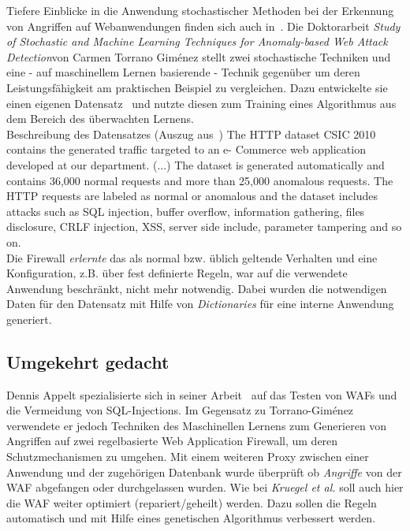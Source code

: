 Tiefere Einblicke in die Anwendung stochastischer Methoden bei der Erkennung von Angriffen auf Webanwendungen finden sich auch in~\cite{Giménez2015}. Die Doktorarbeit \glqq\emph{Study of Stochastic and Machine Learning Techniques for Anomaly-based Web Attack Detection}\grqq von Carmen Torrano Giménez stellt zwei stochastische Techniken und eine - auf maschinellem Lernen basierende - Technik gegenüber um deren Leistungsfähigkeit am praktischen Beispiel zu vergleichen. Dazu entwickelte sie einen eigenen Datensatz~\cite{csic2010} und nutzte diesen zum Training eines Algorithmus aus dem Bereich des überwachten Lernens.\\

\textcolor{bhtGray}{ Beschreibung des Datensatzes (Auszug aus~\cite{csic2010})} The HTTP dataset CSIC 2010 contains the generated traffic targeted to an e- Commerce web application developed at our department. (...) The dataset is generated automatically and contains 36,000 normal requests and more than 25,000 anomalous requests. The HTTP requests are labeled as normal or anomalous and the dataset includes attacks such as SQL injection, buffer overflow, information gathering, files disclosure, CRLF injection, XSS, server side include, parameter tampering and so on.\\

Die Firewall \emph{erlernte} das als normal bzw. üblich geltende Verhalten und eine Konfiguration, z.B. über fest definierte Regeln, war auf die verwendete Anwendung beschränkt, nicht mehr notwendig. Dabei wurden die notwendigen Daten für den Datensatz mit Hilfe von \emph{Dictionaries} für eine interne Anwendung generiert.


\subsection{Umgekehrt gedacht}

Dennis Appelt spezialisierte sich in seiner Arbeit~\cite{Appelt2016} auf das Testen von WAFs und die Vermeidung von SQL-Injections. Im Gegensatz zu Torrano-Giménez verwendete er jedoch Techniken des Maschinellen Lernens zum Generieren von Angriffen auf zwei regelbasierte Web Application Firewall, um deren Schutzmechanismen zu umgehen. Mit einem weiteren Proxy zwischen einer Anwendung und der zugehörigen Datenbank wurde überprüft ob \emph{Angriffe} von der WAF abgefangen oder durchgelassen wurden. Wie bei \emph{Kruegel et al.} soll auch hier die WAF weiter optimiert (repariert/geheilt) werden. Dazu sollen die Regeln automatisch und mit Hilfe eines genetischen Algorithmus verbessert werden.

